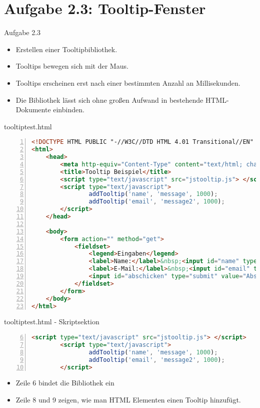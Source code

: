 \section{Aufgabe 2.3: Tooltip-Fenster}
\begin{frame}[<+->]{Aufgabe 2.3}
\normalsize
\begin{itemize}
\item Erstellen einer Tooltipbibliothek.
\item Tooltips bewegen sich mit der Maus.
\item Tooltips erscheinen erst nach einer bestimmten Anzahl an Millisekunden.
\item Die Bibliothek lässt sich ohne großen Aufwand in bestehende HTML-Dokumente einbinden.
\end{itemize}
\end{frame}
\begin{frame}[fragile]{tooltiptest.html}
\tiny{\begin{lstlisting}[language = HTML,
                                   mathescape = true, 
                   breaklines=true, 
                   numbers = left, 
                   numbersep = 3pt]
<!DOCTYPE HTML PUBLIC "-//W3C//DTD HTML 4.01 Transitional//EN" "http://www.w3.org/TR/html4/loose.dtd">
<html>
    <head>
        <meta http-equiv="Content-Type" content="text/html; charset=utf-8">
        <title>Tooltip Beispiel</title>
        <script type="text/javascript" src="jstooltip.js"> </script>
        <script type="text/javascript">
                addTooltip('name', 'message', 1000);
                addTooltip('email', 'message2', 1000);
        </script>
    </head>
    
    <body>
		<form action="" method="get">
			<fieldset>
            	<legend>Eingaben</legend>
                <label>Name:</label>&nbsp;<input id="name" type="text"><br>
                <label>E-Mail:</label>&nbsp;<input id="email" type="text">
                <input id="abschicken" type="submit" value="Abschicken">
			</fieldset>
		</form>    	
    </body>
</html>
\end{lstlisting}
}
\end{frame}
\normalsize
\begin{frame}[<+->][fragile]{tooltiptest.html - Skriptsektion}
\tiny{\begin{lstlisting}[language = HTML,
			numbers=left,
			firstnumber=6,
			numbersep = 3pt]
        <script type="text/javascript" src="jstooltip.js"> </script>
        <script type="text/javascript">
                addTooltip('name', 'message', 1000);
                addTooltip('email', 'message2', 1000);
        </script>
\end{lstlisting}}
\pause
\begin{itemize}
\normalsize
\item Zeile 6 bindet die Bibliothek ein
\item Zeile 8 und 9 zeigen, wie man HTML Elementen einen Tooltip hinzufügt.
\end{itemize}
\end{frame}
